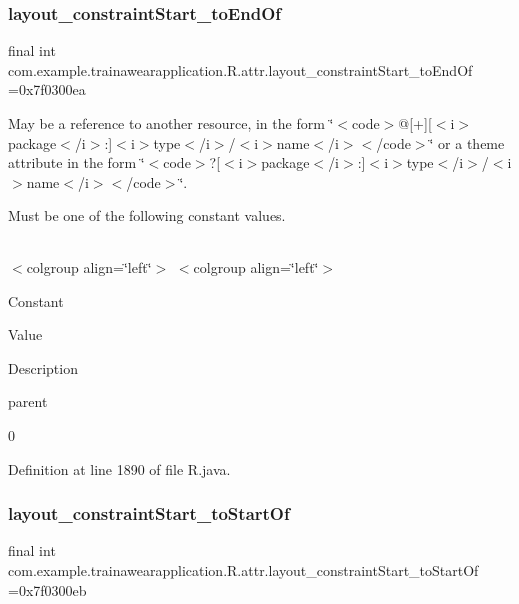 \subsubsection{\texorpdfstring{layout\_constraintStart\_toEndOf}{layout\_constraintStart\_toEndOf}}
{\footnotesize\ttfamily final int com.\+example.\+trainawearapplication.\+R.\+attr.\+layout\+\_\+constraint\+Start\+\_\+to\+End\+Of =0x7f0300ea\hspace{0.3cm}{\ttfamily [static]}}

May be a reference to another resource, in the form \char`\"{}$<$code$>$@\mbox{[}+\mbox{]}\mbox{[}$<$i$>$package$<$/i$>$\+:\mbox{]}$<$i$>$type$<$/i$>$/$<$i$>$name$<$/i$>$$<$/code$>$\char`\"{} or a theme attribute in the form \char`\"{}$<$code$>$?\mbox{[}$<$i$>$package$<$/i$>$\+:\mbox{]}$<$i$>$type$<$/i$>$/$<$i$>$name$<$/i$>$$<$/code$>$\char`\"{}. 

Must be one of the following constant values.

\tabulinesep=1mm
\begin{longtabu}spread 0pt [c]{*{0}{|X[-1]}|}
\hline
\end{longtabu}
$<$colgroup align=\char`\"{}left\char`\"{}$>$ $<$colgroup align=\char`\"{}left\char`\"{}$>$ 

Constant

Value

Description 

parent

0

Definition at line 1890 of file R.\+java.

\mbox{\label{classcom_1_1example_1_1trainawearapplication_1_1_r_1_1attr_a10b6f4835baff9f8fdef56ee07a31091}} 
\subsubsection{\texorpdfstring{layout\_constraintStart\_toStartOf}{layout\_constraintStart\_toStartOf}}
{\footnotesize\ttfamily final int com.\+example.\+trainawearapplication.\+R.\+attr.\+layout\+\_\+constraint\+Start\+\_\+to\+Start\+Of =0x7f0300eb\hspace{0.3cm}{\ttfamily [static]}}

